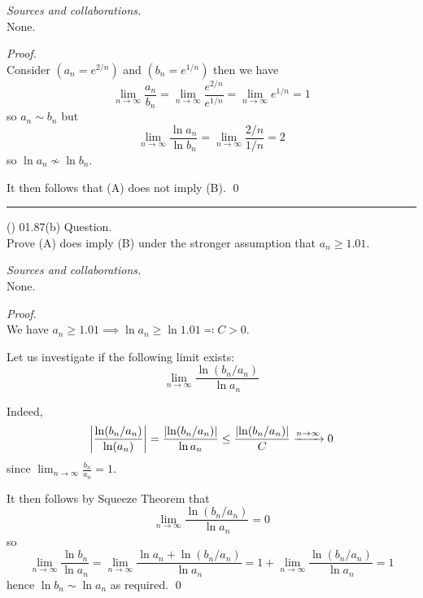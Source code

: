 \documentclass{amsart}
\begin{document}
\medskip\noindent
\emph{Sources and collaborations.}\\
None.

\medskip\noindent
\emph{Proof.}\\
Consider $(a_n = e^{2/n})$ and $(b_n = e^{1/n})$ then we have \begin{equation*}
\lim_{n \to \infty} \frac{a_n}{b_n} = \lim_{n \to \infty} \frac{e^{2/n}}{e^{1/n}} = \lim_{n \to \infty} e^{1/n} = 1
\end{equation*}
so $a_n \sim b_n$ but \begin{equation*}
\lim_{n \to \infty} \frac{\ln a_n}{\ln b_n} = \lim_{n \to \infty} \frac{2/n}{1/n} = 2
\end{equation*}
so $\ln a_n \not \sim \ln b_n$.

It then follows that (A) does not imply (B).
\qed

\bigskip\hrule

\vspace{0.5cm}

\newpage
\Large
{}



\noindent
(\done) 01.87(b) Question. \\
Prove (A) does imply (B) under the stronger assumption that $a_n \geq 1.01$.

\medskip\noindent
\emph{Sources and collaborations.}\\
None.

\medskip\noindent
\emph{Proof.}\\
We have $a_n \geq 1.01 \implies \ln a_n \geq \ln 1.01 \eqqcolon C > 0$.

Let us investigate if the following limit exists:
\begin{equation*}
\lim_{n \to \infty} \frac{\ln(b_n/a_n)}{\ln a_n}
\end{equation*}

Indeed,
\begin{equation*}
    \abs*{\frac{\ln(b_n / a_n)}{\ln(a_n)}} = \frac{\abs{\ln(b_n / a_n)}}{\ln a_n} \leq \frac{\abs{\ln(b_n/a_n)}}{C} \cvgn 0 
\end{equation*}
since $\lim_{n \to \infty} \frac{b_n}{a_n} = 1$.

It then follows by Squeeze Theorem that \begin{equation*}
\lim_{n \to \infty} \frac{\ln(b_n / a_n)}{\ln a_n} = 0
\end{equation*}
so
\begin{equation*}
    \lim_{n \to \infty} \frac{\ln b_n}{\ln a_n} = \lim_{n \to \infty} \frac{\ln a_n + \ln (b_n /a_n)}{\ln a_n} = 1 + \lim_{n \to \infty} \frac{\ln(b_n /a_n)}{\ln a_n} = 1
    \end{equation*}
hence $\ln b_n \sim \ln a_n$ as required.
\qed
\end{document}
